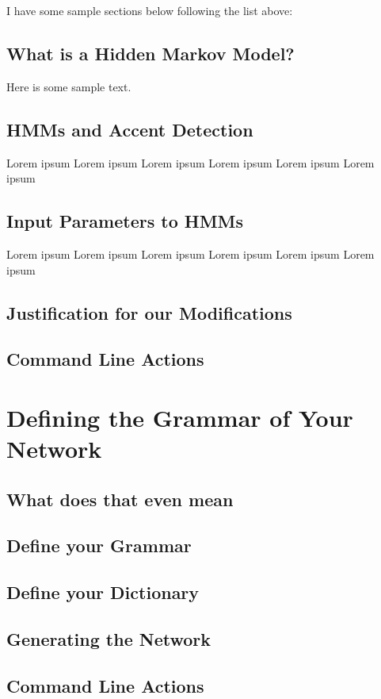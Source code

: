 \documentclass{wileySev}
\begin{document}
I have some sample sections below following the list above:

\section{What is a Hidden Markov Model?}
Here is some sample text.

\section{HMMs and Accent Detection}
Lorem ipsum Lorem ipsum Lorem ipsum Lorem ipsum Lorem ipsum Lorem ipsum

\section{Input Parameters to HMMs} 
Lorem ipsum Lorem ipsum Lorem ipsum Lorem ipsum Lorem ipsum Lorem ipsum

\section{Justification for our Modifications}

\section{Command Line Actions}


\chapter{Defining the Grammar of Your Network}
\section{What does that even mean}
\section{Define your Grammar}
\section{Define your Dictionary}
\section{Generating the Network}
\section{Command Line Actions}
\end{document}
